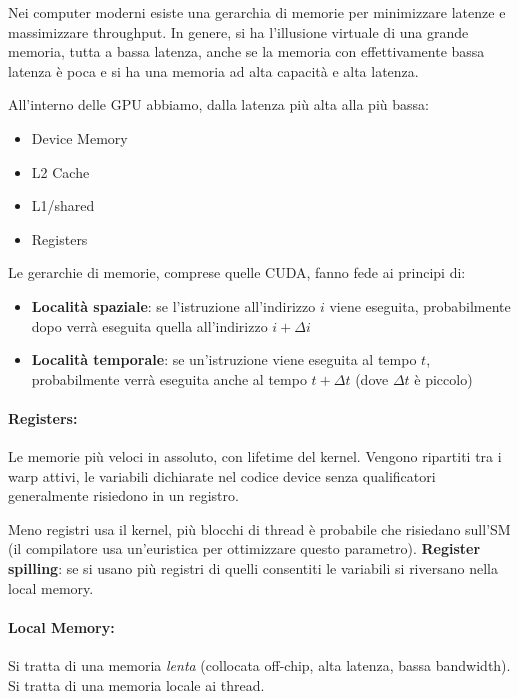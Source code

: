 Nei computer moderni esiste una gerarchia di memorie per minimizzare latenze e massimizzare throughput. In genere, si ha l'illusione virtuale di una grande memoria, tutta a bassa latenza, anche se la memoria con effettivamente bassa latenza è poca e si ha una memoria ad alta capacità e alta latenza.

All'interno delle GPU abbiamo, dalla latenza più alta alla più bassa: 
\begin{itemize}
	\item Device Memory
	
	\item L2 Cache
	
	\item L1/shared
	
	\item Registers
\end{itemize}

Le gerarchie di memorie, comprese quelle CUDA, fanno fede ai principi di: 
\begin{itemize}
	\item \textbf{Località spaziale}: se l'istruzione all'indirizzo $i$ viene eseguita, probabilmente dopo verrà eseguita quella all'indirizzo $i + \Delta i$
	
	\item \textbf{Località temporale}: se un'istruzione viene eseguita al tempo $t$, probabilmente verrà eseguita anche al tempo $t + \Delta t$ (dove $\Delta t$ è piccolo)
\end{itemize}

\paragraph{Registers:} Le memorie più veloci in assoluto, con lifetime del kernel. Vengono ripartiti tra i warp attivi, le variabili dichiarate nel codice device senza qualificatori generalmente risiedono in un registro. 

Meno registri usa il kernel, più blocchi di thread è probabile che risiedano sull'SM (il compilatore usa un'euristica per ottimizzare questo parametro). \textbf{Register spilling}: se si usano più registri di quelli consentiti le variabili si riversano nella local memory.

\paragraph{Local Memory:} Si tratta di una memoria \textit{lenta} (collocata off-chip, alta latenza, bassa bandwidth). Si tratta di una memoria locale ai thread.

